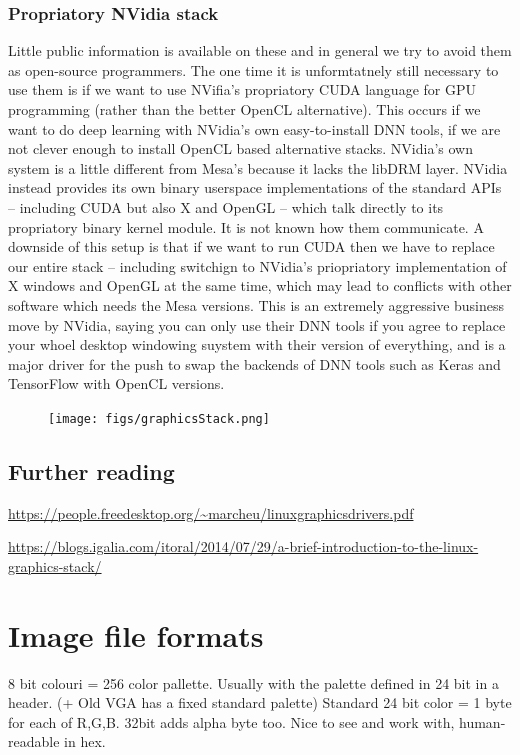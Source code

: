 \documentclass[oneside,english]{scrbook}
\begin{document}
\subsection{Propriatory NVidia stack}
Little public information is available on these and in general we try to avoid them as open-source programmers.   The one time it is unformtatnely still necessary to use them is if we want to use NVifia's propriatory CUDA language for GPU programming (rather than the better OpenCL alternative).  This occurs if we want to do deep learning with NVidia's own easy-to-install DNN tools, if we are not clever enough to install OpenCL based alternative stacks.   NVidia's own system is a little different from Mesa's because it lacks the libDRM layer.  NVidia instead provides its own binary userspace implementations of the standard APIs -- including CUDA but also X and OpenGL -- which talk directly to its propriatory binary kernel module.  It is not known how them communicate.   A downside of this setup is that if we want to run CUDA then we have to replace our entire stack -- including switchign to NVidia's priopriatory implementation of X windows and OpenGL at the same time, which may lead to conflicts with other software which needs the Mesa versions.  This is an extremely aggressive business move by NVidia, saying you can only use their DNN tools if you agree to replace your whoel desktop windowing suystem with their version of everything, and is a major driver for the push to swap the backends of DNN tools such as Keras and TensorFlow with OpenCL versions.  




\begin{figure}
	\caption{}
	\texttt{[image: figs/graphicsStack.png]}
\end{figure}

\section{Further reading}
\url{https://people.freedesktop.org/~marcheu/linuxgraphicsdrivers.pdf}

\url{https://blogs.igalia.com/itoral/2014/07/29/a-brief-introduction-to-the-linux-graphics-stack/}



\chapter{Image file formats}

8 bit colouri = 256 color pallette. Usually with the palette defined in 24 bit in a header. (+ Old VGA has a fixed standard palette)
Standard 24 bit color = 1 byte for each of R,G,B. 32bit adds alpha byte too.  Nice to see and work with, human-readable in hex.
\end{document}
